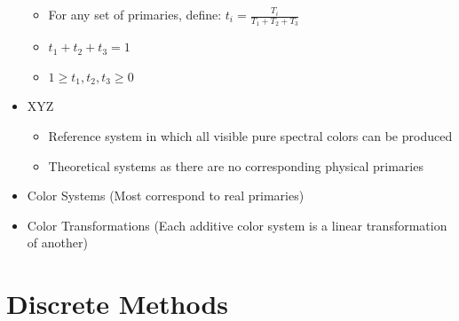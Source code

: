 \documentclass[11pt,a4paper]{article}
\begin{document}
\begin{itemize}
				\begin{itemize}
					\item For any set of primaries, define: $t_i = \frac{T_i}{T_1 + T_2 + T_3}$
					\item $t_1 + t_2 + t_3 = 1$
					\item $1 \ge t_1,t_2,t_3 \ge 0$
				\end{itemize}
			\item XYZ
				\begin{itemize}
					\item Reference system in which all visible pure spectral colors can be produced	
					\item Theoretical systems as there are no corresponding physical primaries
				\end{itemize}
			\item Color Systems (Most correspond to real primaries)
			\item Color Transformations (Each additive color system is a linear transformation of another)
		\end{itemize}
	
\section{Discrete Methods}
\end{document}
